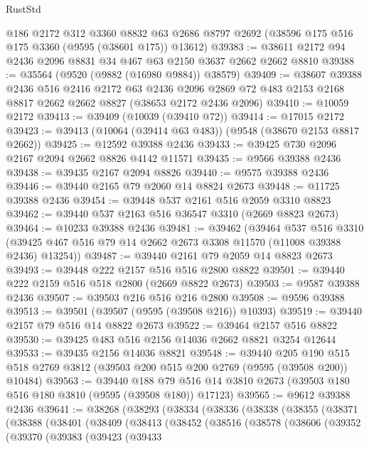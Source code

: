 \begin{lexlean}{RustStd}
\begin{coremodule}
    @186
    @2172
    @312
    @3360
    @8832
    @63
    @2686
    @8797
    @2692
    (@38596 @175 @516 @175 @3360 (@9595 (@38601 @175)) @13612)
@39383 := @38611 @2172 @94 @2436 @2096 @8831 @34 @467 @63 @2150 @3637 @2662 @2662 @8810
@39388 := @35564 (@9520 (@9882 (@16980 @9884)) @38579)
@39409 := @38607
    @39388
    @2436
    @516
    @2416
    @2172
    @63
    @2436
    @2096
    @2869
    @72
    @483
    @2153
    @2168
    @8817
    @2662
    @2662
    @8827
    (@38653 @2172 @2436 @2096)
@39410 := @10059 @2172
@39413 := @39409 (@10039 (@39410 @72))
@39414 := @17015 @2172
@39423 := @39413 (@10064 (@39414 @63 @483)) (@9548 (@38670 @2153 @8817 @2662))
@39425 := @12592 @39388 @2436
@39433 := @39425 @730 @2096 @2167 @2094 @2662 @8826 @4142 @11571
@39435 := @9566 @39388 @2436
@39438 := @39435 @2167 @2094 @8826
@39440 := @9575 @39388 @2436
@39446 := @39440 @2165 @79 @2060 @14 @8824 @2673
@39448 := @11725 @39388 @2436
@39454 := @39448 @537 @2161 @516 @2059 @3310 @8823
@39462 := @39440 @537 @2163 @516 @36547 @3310 (@2669 @8823 @2673)
@39464 := @10233 @39388 @2436
@39481 := @39462
    (@39464
      @537
      @516
      @3310
      (@39425 @467 @516 @79 @14 @2662 @2673 @3308 @11570 (@11008 @39388 @2436) @13254))
@39487 := @39440 @2161 @79 @2059 @14 @8823 @2673
@39493 := @39448 @222 @2157 @516 @516 @2800 @8822
@39501 := @39440 @222 @2159 @516 @518 @2800 (@2669 @8822 @2673)
@39503 := @9587 @39388 @2436
@39507 := @39503 @216 @516 @216 @2800
@39508 := @9596 @39388
@39513 := @39501 (@39507 (@9595 (@39508 @216)) @10393)
@39519 := @39440 @2157 @79 @516 @14 @8822 @2673
@39522 := @39464 @2157 @516 @8822
@39530 := @39425 @483 @516 @2156 @14036 @2662 @8821 @3254 @12644
@39533 := @39435 @2156 @14036 @8821
@39548 := @39440
    @205
    @190
    @515
    @518
    @2769
    @3812
    (@39503 @200 @515 @200 @2769 (@9595 (@39508 @200)) @10484)
@39563 := @39440
    @188
    @79
    @516
    @14
    @3810
    @2673
    (@39503 @180 @516 @180 @3810 (@9595 (@39508 @180)) @17123)
@39565 := @9612 @39388 @2436
@39641 := @38268
    (@38293
      (@38334
        (@38336
          (@38338
            (@38355
              (@38371
                (@38388
                  (@38401
                    (@38409
                      (@38413
                        (@38452
                          (@38516
                            (@38578
                              (@38606
                                (@39352
                                  (@39370
                                    (@39383
                                      (@39423
                                        (@39433

\end{coremodule}
\end{lexlean}
